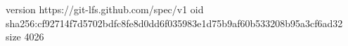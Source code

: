version https://git-lfs.github.com/spec/v1
oid sha256:cf92714f7d5702bdfc8fe8d0dd6f035983e1d75b9af60b533208b95a3cf6ad32
size 4026
